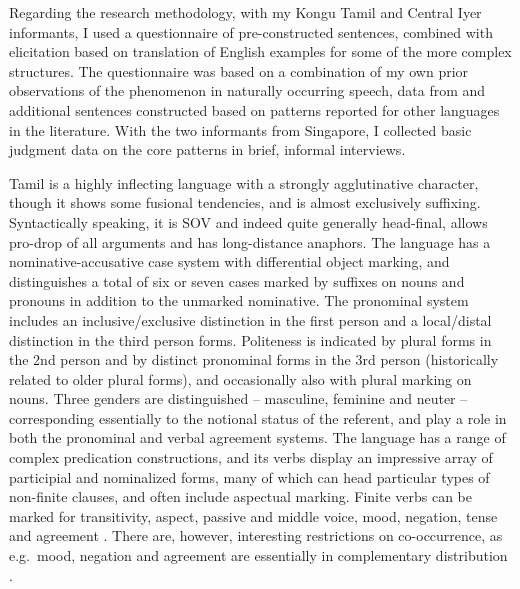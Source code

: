 \documentclass[output=paper, modfonts, nonflat]{langsci/langscibook}
\begin{document}
Regarding the research methodology, with my Kongu Tamil and Central
Iyer informants, I used a questionnaire of pre-constructed sentences,
combined with elicitation based on translation of English examples for
some of the more complex structures. The questionnaire was based on a
combination of my own prior observations of the phenomenon in
naturally occurring speech, data from \citet{amrit:1991} and
additional sentences constructed based on patterns reported for other
languages in the literature. With the two informants from Singapore, I
collected basic judgment data on the core patterns in brief, informal
interviews.


Tamil is a highly inflecting language with a strongly agglutinative
character, though it shows some fusional tendencies, and is almost
exclusively suffixing. Syntactically speaking, it is SOV and indeed
quite generally head-final, allows pro-drop of all arguments and has
long-distance anaphors. The language has a nominative-accusative case
system with differential object marking, and distinguishes a total of
six or seven cases marked by suffixes on nouns and pronouns in
addition to the unmarked nominative. The pronominal system includes an
inclusive/exclusive distinction in the first person and a local/distal
distinction in the third person forms. Politeness is indicated by
plural forms in the 2nd person and by distinct pronominal forms in the
3rd person (historically related to older plural forms), and
occasionally also with plural marking on nouns. Three genders are
distinguished -- masculine, feminine and neuter -- corresponding
essentially to the notional status of the referent, and play a role in
both the pronominal and verbal agreement systems. The language has a
range of complex predication constructions, and its verbs display an
impressive array of participial and nominalized forms, many of which
can head particular types of non-finite clauses, and often include
aspectual marking. Finite verbs can be marked for transitivity,
aspect, passive and middle voice, mood, negation, tense and agreement
\citep[]{sundaresanmcfadden:tamtrans}. There are, however, interesting
restrictions on co-occurrence, as e.g.\ mood, negation and agreement
are essentially in complementary distribution
\citep[][]{amritjay:2005}.
\end{document}
